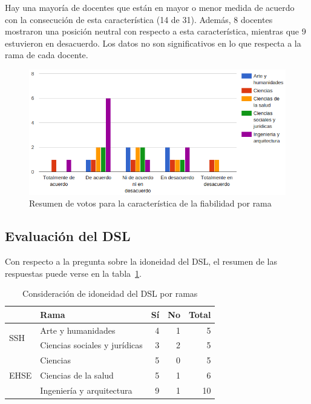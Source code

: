 Hay una mayoría de docentes que están en mayor o menor medida de acuerdo con la consecución de esta característica (14 de 31). Además, 8 docentes mostraron una posición neutral con respecto a esta característica, mientras que 9 estuvieron en desacuerdo. Los datos no son significativos en lo que respecta a la rama de cada docente.

\begin{figure}[h]
  \begin{center}
    \includegraphics[scale=0.5]{C_DBA_fiabilidad_rama.png}
  \end{center}
  \caption{Resumen de votos para la característica de la fiabilidad por rama}
  \label{fig:evalmetodo:dba:fiabilidad:rama}
\end{figure}


\subsection{Evaluación del DSL}

Con respecto a la pregunta sobre la idoneidad del DSL, el resumen de las respuestas puede verse en la tabla~\ref{tab:evalmetodo:encuesta:DSL:rama}.

\begin{table}[H]
  \begin{center}
  \begin{tabular}{| l | l | r | r | r |}
    \hline
    & Rama & Sí & No & Total \\
    \hline
    \hline
    \multirow{2}{2.5cm}{SSH} & Arte y humanidades & 4 & 1 & 5  \\
    \cline{2-5}
    & Ciencias sociales y jurídicas & 3 & 2 & 5  \\
    \hline
    \multirow{3}{2.5cm}{EHSE} & Ciencias & 5 & 0 & 5  \\
    \cline{2-5}
    & Ciencias de la salud & 5 & 1 & 6  \\
    \cline{2-5}
    & Ingeniería y arquitectura & 9 & 1 & 10 \\
    \hline
  \end{tabular}
\end{center}
\caption{Consideración de idoneidad del DSL por ramas}
\label{tab:evalmetodo:encuesta:DSL:rama}
\end{table}

